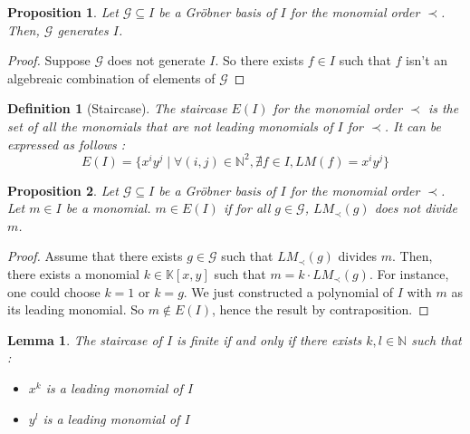 \documentclass{article}
\newtheorem{lemma}{Lemma}[section]
\newtheorem{definition}{Definition}[section]
\newtheorem{proposition}{Proposition}[section]
\begin{document}
\begin{proposition} \label{proposition:g-generates-i}
    Let $\mathscr{G} \subseteq I$ be a Gröbner basis of $I$ for the monomial order $\prec$. Then, $\mathscr{G}$ generates $I$.
\end{proposition}

\begin{proof} %
    Suppose $\mathscr{G}$ does not generate $I$. So there exists $f \in I$ such that $f$ isn't an algebreaic combination of elements of $\mathscr{G}$
\end{proof}

\begin{definition}[Staircase]
    The staircase $E(I)$ for the monomial order $\prec$ is the set of all the monomials that are not leading monomials of $I$ for $\prec$. It can be expressed as follows : 
    \begin{displaymath}
        E(I) = \{ x^{i}y^{j} \mid \forall (i, j) \in \mathbb{N}^{2}, \nexists f \in I, LM(f) = x^{i}y^{j}\}
    \end{displaymath}
\end{definition}

\begin{proposition} \label{proposition:monomial-in-staircase}
    Let $\mathscr{G} \subseteq I$ be a Gröbner basis of $I$ for the monomial order $\prec$. Let $m \in I$ be a monomial. $m \in E(I)$ if for all $g \in \mathscr{G}$, $LM_{\prec}(g)$ does not divide $m$.
\end{proposition}

\begin{proof}
    Assume that there exists $g \in \mathscr{G}$ such that $LM_{\prec}(g)$ divides $m$. Then, there exists a monomial $k \in \mathbb{K}[x, y]$ such that $m = k \cdot LM_{\prec}(g)$. For instance, one could choose $k = 1$ or $k = g$. We just constructed a polynomial of $I$ with $m$ as its leading monomial. So $m \notin E(I)$, hence the result by contraposition.
\end{proof}

\begin{lemma} \label{lemma:finite-staircase-lm}
    The staircase of $I$ is finite if and only if there exists $k, l \in \mathbb{N}$ such that :
    \begin{itemize}
        \item $x^{k}$ is a leading monomial of I
        \item $y^{l}$ is a leading monomial of I
    \end{itemize}
\end{lemma}
\end{document}
